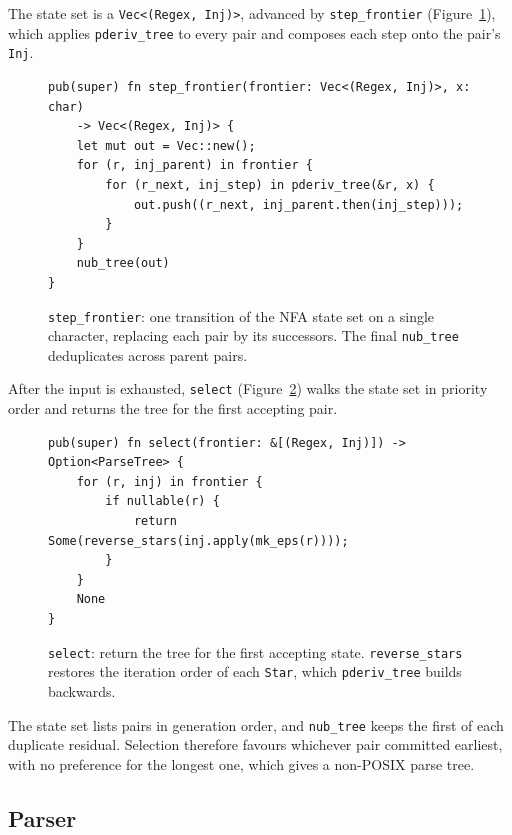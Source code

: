 %

The state set is a \texttt{Vec<(Regex, Inj)>}, 
advanced by \texttt{step\_frontier} (Figure~\ref{fig:step-frontier-rust}), 
which applies \texttt{pderiv\_tree} to every pair 
and composes each step onto the pair's \texttt{Inj}.
\begin{figure}[H]
\small
\begin{verbatim}
pub(super) fn step_frontier(frontier: Vec<(Regex, Inj)>, x: char) 
    -> Vec<(Regex, Inj)> {
    let mut out = Vec::new();
    for (r, inj_parent) in frontier {
        for (r_next, inj_step) in pderiv_tree(&r, x) {
            out.push((r_next, inj_parent.then(inj_step)));
        }
    }
    nub_tree(out)
}
\end{verbatim}
\caption{\texttt{step\_frontier}: one transition of the NFA state set on
a single character, replacing each pair by its successors. The final
\texttt{nub\_tree} deduplicates across parent pairs.}
\label{fig:step-frontier-rust}
\end{figure}

%

\clearpage
After the input is exhausted, 
\texttt{select} (Figure~\ref{fig:select-rust}) 
walks the state set in priority order 
and returns the tree for the first accepting pair.
\begin{figure}[H]
\small
\begin{verbatim}
pub(super) fn select(frontier: &[(Regex, Inj)]) -> Option<ParseTree> {
    for (r, inj) in frontier {
        if nullable(r) {
            return Some(reverse_stars(inj.apply(mk_eps(r))));
        }
    }
    None
}
\end{verbatim}
\caption{\texttt{select}: return the tree for the first accepting state.
\texttt{reverse\_stars} restores the iteration order of each
\texttt{Star}, which \texttt{pderiv\_tree} builds backwards.}
\label{fig:select-rust}
\end{figure}

The state set lists pairs in generation order, 
and \texttt{nub\_tree} keeps the first of each duplicate residual. 
Selection therefore favours whichever pair committed earliest, 
with no preference for the longest one, which gives a non-POSIX parse tree.

%
%
%

\subsection{Parser}
\label{sec:pderiv-std-parser}

